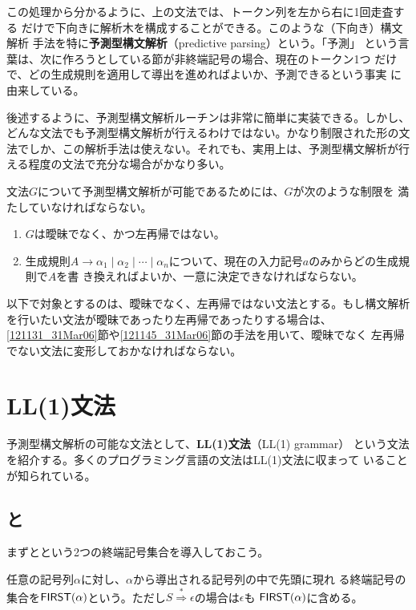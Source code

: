 この処理から分かるように、上の文法では、トークン列を左から右に1回走査する
だけで下向きに解析木を構成することができる。このような（下向き）構文解析
手法を特に{\bfseries 予測型構文解析}（predictive parsing）という。「予測」
という言葉は、次に作ろうとしている節が非終端記号の場合、現在のトークン1つ
だけで、どの生成規則を適用して導出を進めればよいか、予測できるという事実
に由来している。

後述するように、予測型構文解析ルーチンは非常に簡単に実装できる。しかし、
どんな文法でも予測型構文解析が行えるわけではない。かなり制限された形の文
法でしか、この解析手法は使えない。それでも、実用上は、予測型構文解析が行
える程度の文法で充分な場合がかなり多い。

文法$G$について予測型構文解析が可能であるためには、$G$が次のような制限を
満たしていなければならない。
\begin{enumerate}
 \item $G$は曖昧でなく、かつ左再帰ではない。
 \item 生成規則$A \rightarrow \alpha_1 \mid \alpha_2 \mid \cdots \mid
       \alpha_n $について、現在の入力記号$a$のみからどの生成規則で$A$を書
       き換えればよいか、一意に決定できなければならない。
\end{enumerate}

以下で対象とするのは、曖昧でなく、左再帰ではない文法とする。もし構文解析
を行いたい文法が曖昧であったり左再帰であったりする場合は、
\ref{121131_31Mar06}節や\ref{121145_31Mar06}節の手法を用いて、曖昧でなく
左再帰でない文法に変形しておかなければならない。

\section{LL(1)文法}
\label{160007_10Apr06}

予測型構文解析の可能な文法として、{\bfseries LL(1)文法}（LL(1) grammar）
という文法を紹介する。多くのプログラミング言語の文法はLL(1)文法に収まって
いることが知られている。

\subsection{\First と\Follow}

まず\First と\Follow という2つの終端記号集合を導入しておこう。

任意の記号列$\alpha$に対し、$\alpha$から導出される記号列の中で先頭に現れ
る終端記号の集合を${\sf FIRST}(\alpha)$という。ただし$S
\stackrel{*}{\Rightarrow} \epsilon$の場合は$\epsilon$も
${\sf FIRST}(\alpha)$に含める。

